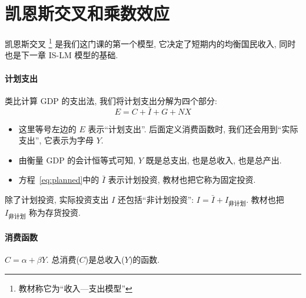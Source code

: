 \documentclass[11pt]{ctexart}
\begin{document}
\section*{凯恩斯交叉和乘数效应}

凯恩斯交叉%
  \footnote{教材称它为``收入—支出模型''}
是我们这门课的第一个模型, 它决定了短期内的均衡国民收入, 
同时也是下一章 IS-LM 模型的基础.


\paragraph{计划支出}
类比计算 GDP 的支出法, 我们将计划支出分解为四个部分: 
\begin{equation}
E = C + \bar{I} + G + NX 
\label{eq:planned}  
\end{equation}
\begin{itemize}
\item
  这里等号左边的 $E$ 表示``计划支出''. 后面定义消费函数时, 我们还会用到``实际支出'', 它表示为字母 $Y$. 
\item
  由衡量 GDP 的会计恒等式可知, $Y$ 既是总支出, 也是总收入, 也是总产出.
\item
  方程~\eqref{eq:planned}中的 $\bar{I}$ 表示计划投资, 教材也把它称为固定投资. 
\end{itemize}

除了计划投资, 实际投资支出 $I$ 还包括``非计划投资'': $I = \bar{I} + I_{\text{非计划}}$.
教材也把 $I_{\text{非计划}}$ 称为存货投资. 


\paragraph{消费函数} $C = \alpha + \beta  Y$. 总消费($C$)是总收入($Y$)的函数.  
\end{document}
